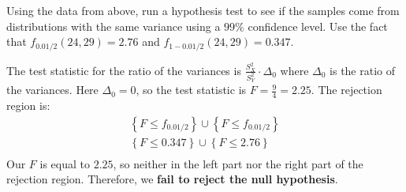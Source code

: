 
Using the data from above, run a hypothesis test to see if the samples come from
distributions with the same variance using a $99$\% confidence level. Use the fact
that $f_{0.01/2}(24, 29) = 2.76$ and $f_{1-0.01/2}(24, 29) = 0.347$. 



The test statistic for the ratio of the variances is $\frac{S_X^2}{S_Y^2} \cdot \Delta_0$
where $\Delta_0$ is the ratio of the variances. Here $\Delta_0 = 0$, so the test statistic
is $F = \frac{9}{4}=2.25$. The rejection region is:
\begin{align*}
\left\{F \leq f_{0.01/2} \right\} \cup \left\{F \leq f_{0.01/2} \right\} \\
\left\{F \leq 0.347 \right\} \cup \left\{F \leq 2.76 \right\} \\
\end{align*}
Our $F$ is equal to $2.25$, so neither in the left part nor the right part of the 
rejection region. Therefore, we \textbf{fail to reject the null hypothesis}.


